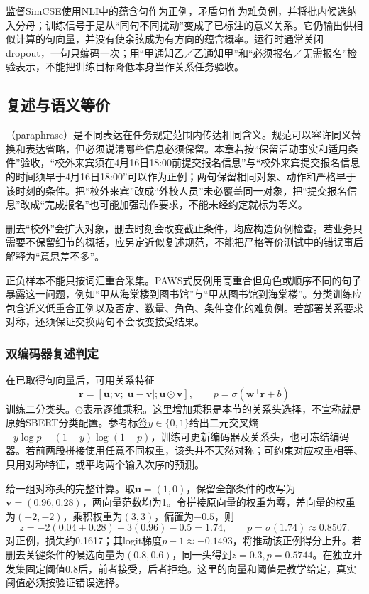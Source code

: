 监督SimCSE使用NLI中的蕴含句作为正例，矛盾句作为难负例，并将批内候选纳入分母；训练信号于是从“同句不同扰动”变成了已标注的意义关系。它仍输出供相似计算的句向量，并没有使余弦成为有方向的蕴含概率。运行时通常关闭dropout，一句只编码一次；用“甲通知乙／乙通知甲”和“必须报名／无需报名”检验表示，不能把训练目标降低本身当作关系任务验收。

\subsection{复述与语义等价}
\label{sec:nlp-classification-paraphrase}

（paraphrase）是不同表达在任务规定范围内传达相同含义。规范可以容许同义替换和表达省略，但必须说清哪些信息必须保留。本章若按“保留活动事实和适用条件”验收，“校外来宾须在4月16日18:00前提交报名信息”与“校外来宾提交报名信息的时间须早于4月16日18:00”可以作为正例；两句保留相同对象、动作和严格早于该时刻的条件。把“校外来宾”改成“外校人员”未必覆盖同一对象，把“提交报名信息”改成“完成报名”也可能加强动作要求，不能未经约定就标为等义。

删去“校外”会扩大对象，删去时刻会改变截止条件，均应构造负例检查。若业务只需要不保留细节的概括，应另定近似复述规范，不能把严格等价测试中的错误事后解释为“意思差不多”。

正负样本不能只按词汇重合采集。PAWS式反例用高重合但角色或顺序不同的句子暴露这一问题，例如“甲从海棠楼到图书馆”与“甲从图书馆到海棠楼”。分类训练应包含近义低重合正例以及否定、数量、角色、条件变化的难负例。若部署关系要求对称，还须保证交换两句不会改变接受结果。

\subsubsection{双编码器复述判定}
\label{sec:nlp-classification-paraphrase-bi}

在已取得句向量后，可用关系特征
\[
  \bm r=[\bm u;\bm v;|\bm u-\bm v|;\bm u\odot\bm v],
  \qquad p=\sigma(\bm w^\top\bm r+b)
\]
训练二分类头。$\odot$表示逐维乘积。这里增加乘积是本节的关系头选择，不宣称就是原始SBERT分类配置。参考标签$y\in\{0,1\}$给出二元交叉熵$-y\log p-(1-y)\log(1-p)$，训练可更新编码器及关系头，也可冻结编码器。若前两段拼接使用任意不同权重，该头并不天然对称；可约束对应权重相等、只用对称特征，或平均两个输入次序的预测。

给一组对称头的完整计算。取$\bm u=(1,0)$，保留全部条件的改写为$\bm v=(0.96,0.28)$，两向量范数均为1。令拼接原向量的权重为零，差向量的权重为$(-2,-2)$，乘积权重为$(3,3)$，偏置为$-0.5$，则
\[
  z=-2(0.04+0.28)+3(0.96)-0.5=1.74,\qquad
  p=\sigma(1.74)\approx0.8507.
\]
对正例，损失约0.1617；其logit梯度$p-1\approx-0.1493$，将推动该正例得分上升。若删去关键条件的候选向量为$(0.8,0.6)$，同一头得到$z=0.3,p=0.5744$。在独立开发集固定阈值0.8后，前者接受，后者拒绝。这里的向量和阈值是教学给定，真实阈值必须按验证错误选择。

